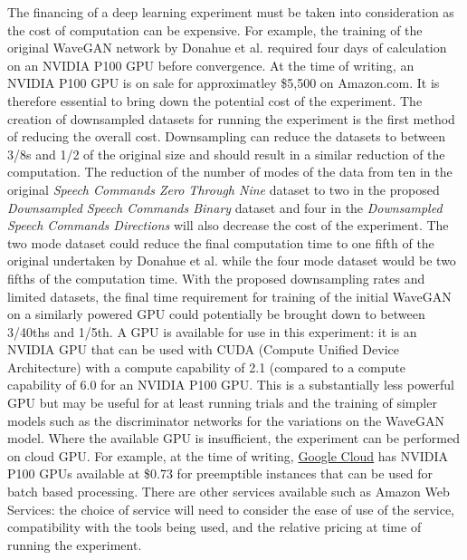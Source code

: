 \documentclass[a4paper, titlepage]{article}
\begin{document}
The financing of a deep learning experiment must be taken into consideration as the cost of computation can be expensive.
For example, the training of the original WaveGAN network by Donahue et al. required four days of calculation on an NVIDIA P100 GPU before convergence.
At the time of writing, an NVIDIA P100 GPU is on sale for approximatley \$5,500 on Amazon.com.
It is therefore essential to bring down the potential cost of the experiment.
\newline
\newline
The creation of downsampled datasets for running the experiment is the first method of reducing the overall cost.
Downsampling can reduce the datasets to between 3/8s and 1/2 of the original size and should result in a similar reduction of the computation.
\newline
\newline
The reduction of the number of modes of the data from ten in the original \textit{Speech Commands Zero Through Nine} dataset to two in the proposed \textit{Downsampled Speech Commands Binary} dataset and four in the \textit{Downsampled Speech Commands Directions} will also decrease the cost of the experiment.
The two mode dataset could reduce the final computation time to one fifth of the original undertaken by Donahue et al. while the four mode dataset would be two fifths of the computation time.
\newline
\newline
With the proposed downsampling rates and limited datasets, the final time requirement for training of the initial WaveGAN on a similarly powered GPU could potentially be brought down to between 3/40ths and 1/5th.
\newline
\newline
A GPU is available for use in this experiment: it is an NVIDIA GPU that can be used with CUDA (Compute Unified Device Architecture) with a compute capability of 2.1 (compared to a compute capability of 6.0 for an NVIDIA P100 GPU.
This is a substantially less powerful GPU but may be useful for at least running trials and the training of simpler models such as the discriminator networks for the variations on the WaveGAN model.
\newline
\newline
Where the available GPU is insufficient, the experiment can be performed on cloud GPU.
For example, at the time of writing, \href{https://cloud.google.com/gpu/}{Google Cloud} has NVIDIA P100 GPUs available at \$0.73 for preemptible instances that can be used for batch based processing.
There are other services available such as Amazon Web Services: the choice of service will need to consider the ease of use of the service, compatibility with the tools being used, and the relative pricing at time of running the experiment.

\newpage



\end{document}
